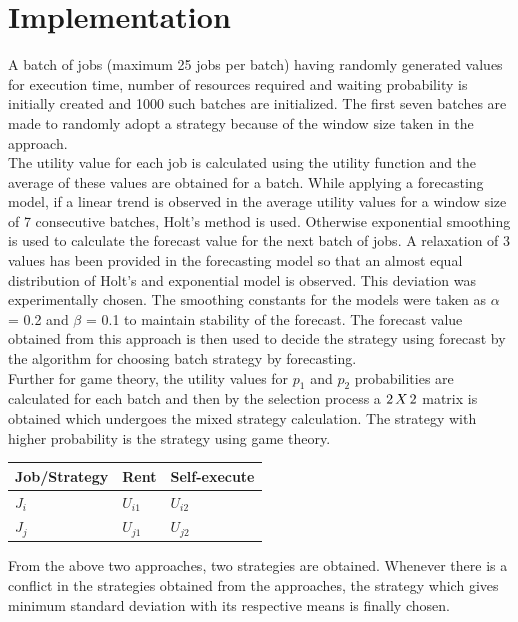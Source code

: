 \section{Implementation}
A batch of jobs (maximum 25 jobs per batch) having randomly generated values for execution time, number of resources required and waiting probability is initially created and 1000 such batches are initialized. The first seven batches are made to randomly adopt a strategy because of the window size taken in the approach.\\[0.2cm]
The utility value for each job is calculated using the utility function and the average of these values are obtained for a batch. While applying a forecasting model, if a linear trend is observed in the average utility values for a window size of 7 consecutive batches, Holt's method is used. Otherwise exponential smoothing is used to calculate the forecast value for the next batch of jobs. A relaxation of 3 values has been provided in the forecasting model so that an almost equal distribution of Holt's and exponential model is observed. This deviation was experimentally chosen. The smoothing constants for the models were taken as $\alpha$ = 0.2 and $\beta$ = 0.1 to maintain stability of the forecast. The forecast value obtained from this approach is then used to decide the strategy using forecast by the algorithm for choosing batch strategy by forecasting.\\[0.2cm]
Further for game theory, the utility values for $p_1$ and $p_2$ probabilities are calculated for each batch and then by the selection process a $2\hspace*{0.5mm}X\hspace*{0.5mm}2$ matrix is obtained which undergoes the mixed strategy calculation. The strategy with higher probability is the strategy using game theory.
\begin{center}
    \begin{tabular}{ | l | p{2cm} | p{2cm} |}
    \hline
    \small {Job/Strategy} & Rent & Self-execute \\ \hline
    $J_i$ & $U_{i1}$ & $U_{i2}$\\ \hline
    $J_j$ & $U_{j1}$ & $U_{j2}$\\ \hline
    \end{tabular}
\end{center}
From the above two approaches, two strategies are obtained. Whenever there is a conflict in the strategies obtained from the approaches, the strategy which gives minimum standard deviation with its respective means is finally chosen.\\[0.2cm]
